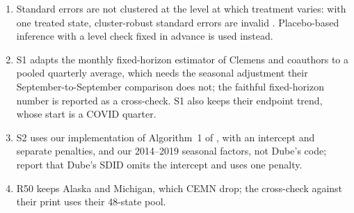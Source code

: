 \begin{enumerate}
  \item Standard errors are not clustered at the level at which treatment varies: with one treated
        state, cluster-robust standard errors are invalid \citep{dube2026labor,clemens2025did,sosinskiy2026effects}.
        Placebo-based inference with a level check fixed in advance is used instead.
  \item S1 adapts the monthly fixed-horizon estimator of Clemens and coauthors to a pooled quarterly
        average, which needs the seasonal adjustment their September-to-September comparison does
        not; the faithful fixed-horizon number is reported as a cross-check. S1 also keeps their
        endpoint trend, whose start is a COVID quarter.
  \item S2 uses our implementation of Algorithm~1 of \citet{arkhangelsky2021synthetic}, with an
        intercept and separate penalties, and our 2014--2019 seasonal factors, not Dube's code;
        \citet{clemens2026synthetic} report that Dube's SDID omits the intercept and uses one penalty.
  \item R50 keeps Alaska and Michigan, which CEMN drop; the cross-check against their print uses
        their 48-state pool.
\end{enumerate}
